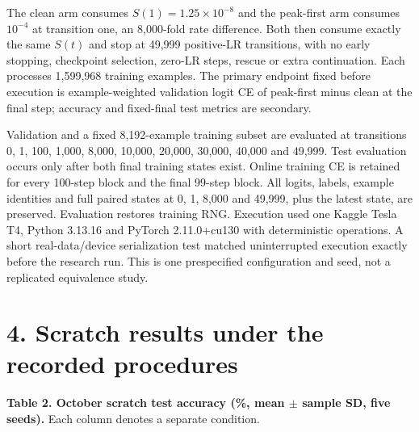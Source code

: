 \documentclass[smallextended]{svjour3}
\begin{document}
The clean arm consumes \(S(1)=1.25\times10^{-8}\) and the peak-first arm consumes \(10^{-4}\) at transition one, an 8,000-fold rate difference. Both then consume exactly the same \(S(t)\) and stop at 49,999 positive-LR transitions, with no early stopping, checkpoint selection, zero-LR steps, rescue or extra continuation. Each processes 1,599,968 training examples. The primary endpoint fixed before execution is example-weighted validation logit CE of peak-first minus clean at the final step; accuracy and fixed-final test metrics are secondary.

Validation and a fixed 8,192-example training subset are evaluated at transitions 0, 1, 100, 1,000, 8,000, 10,000, 20,000, 30,000, 40,000 and 49,999. Test evaluation occurs only after both final training states exist. Online training CE is retained for every 100-step block and the final 99-step block. All logits, labels, example identities and full paired states at 0, 1, 8,000 and 49,999, plus the latest state, are preserved. Evaluation restores training RNG. Execution used one Kaggle Tesla T4, Python 3.13.16 and PyTorch 2.11.0+cu130 with deterministic operations. A short real-data/device serialization test matched uninterrupted execution exactly before the research run. This is one prespecified configuration and seed, not a replicated equivalence study.


\section{4. Scratch results under the recorded procedures}\label{scratch-results-under-the-recorded-procedures}


\textbf{Table 2. October scratch test accuracy (\%, mean \(\pm\) sample SD, five seeds).} Each column denotes a separate condition.
\end{document}
